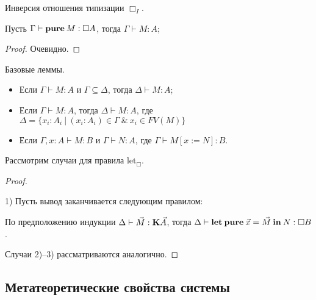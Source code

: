 \begin{lemma} Инверсия отношения типизации ${\Box}_I$.

Пусть $\Gamma \vdash {\bf pure \:} M : \Box A$, тогда $\Gamma \vdash M : A$;
\end{lemma}

\begin{proof}
Очевидно.
\end{proof}

\begin{lemma} Базовые леммы.

\begin{itemize}
\item Если $\Gamma \vdash M : A$ и $\Gamma \subseteq \Delta$, тогда $\Delta \vdash M : A$;
\item Если $\Gamma \vdash M : A$, тогда $\Delta \vdash M : A$, где $\Delta = \{ x_i : A_i \: | \: (x_i : A_i) \in \Gamma \: \& \: x_i \in FV(M) \}$
\item Если $\Gamma, x : A \vdash M : B$ и $\Gamma \vdash N : A$, где $\Gamma \vdash M [x := N] : B$.
\end{itemize}
\end{lemma}

Рассмотрим случаи для правила $\text{let}_{\Box}$.

\begin{proof}
$ $

1) Пусть вывод заканчивается следующим правилом:

\begin{prooftree}
\end{prooftree}

По предположению индукции $\Delta \vdash \vec{M} : {\bf K} \vec{A}$, тогда $\Delta \vdash {\bf let \: pure \:} \vec{x} = \vec{M} {\: \bf in \: } N : \Box B$.

\vspace{\baselineskip}

Случаи 2)--3) рассматриваются аналогично.

\end{proof}

\subsection{Метатеоретические свойства системы}

